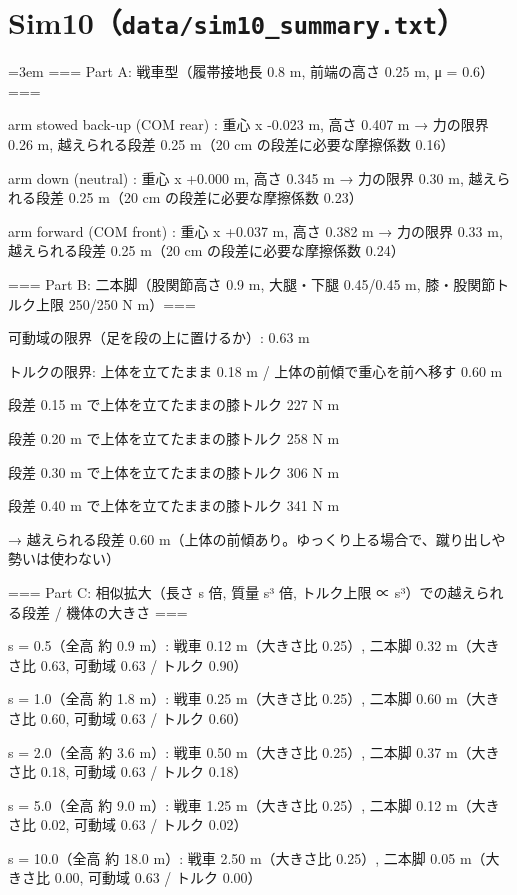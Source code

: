 \section{Sim10（\texttt{data/sim10\_summary.txt}）}
{\footnotesize\raggedright\sloppy\setlength{\parindent}{0pt}\setlength{\parskip}{0pt}\emergencystretch=3em
=== Part A: 戦車型（履帯接地長 0.8 m, 前端の高さ 0.25 m, μ = 0.6）===\par
  arm stowed back-up (COM rear) : 重心 x -0.023 m, 高さ 0.407 m → 力の限界 0.26 m, 越えられる段差 0.25 m（20 cm の段差に必要な摩擦係数 0.16）\par
  arm down (neutral)            : 重心 x +0.000 m, 高さ 0.345 m → 力の限界 0.30 m, 越えられる段差 0.25 m（20 cm の段差に必要な摩擦係数 0.23）\par
  arm forward (COM front)       : 重心 x +0.037 m, 高さ 0.382 m → 力の限界 0.33 m, 越えられる段差 0.25 m（20 cm の段差に必要な摩擦係数 0.24）\par
\mbox{}\par
=== Part B: 二本脚（股関節高さ 0.9 m, 大腿・下腿 0.45/0.45 m, 膝・股関節トルク上限 250/250 N m）===\par
  可動域の限界（足を段の上に置けるか）: 0.63 m\par
  トルクの限界: 上体を立てたまま 0.18 m / 上体の前傾で重心を前へ移す 0.60 m\par
    段差 0.15 m で上体を立てたままの膝トルク    227 N m\par
    段差 0.20 m で上体を立てたままの膝トルク    258 N m\par
    段差 0.30 m で上体を立てたままの膝トルク    306 N m\par
    段差 0.40 m で上体を立てたままの膝トルク    341 N m\par
  → 越えられる段差 0.60 m（上体の前傾あり。ゆっくり上る場合で、蹴り出しや勢いは使わない）\par
\mbox{}\par
=== Part C: 相似拡大（長さ s 倍, 質量 s³ 倍, トルク上限 ∝ s³）での越えられる段差 / 機体の大きさ ===\par
  s =  0.5（全高 約  0.9 m）: 戦車   0.12 m（大きさ比 0.25）, 二本脚   0.32 m（大きさ比 0.63, 可動域 0.63 / トルク 0.90）\par
  s =  1.0（全高 約  1.8 m）: 戦車   0.25 m（大きさ比 0.25）, 二本脚   0.60 m（大きさ比 0.60, 可動域 0.63 / トルク 0.60）\par
  s =  2.0（全高 約  3.6 m）: 戦車   0.50 m（大きさ比 0.25）, 二本脚   0.37 m（大きさ比 0.18, 可動域 0.63 / トルク 0.18）\par
  s =  5.0（全高 約  9.0 m）: 戦車   1.25 m（大きさ比 0.25）, 二本脚   0.12 m（大きさ比 0.02, 可動域 0.63 / トルク 0.02）\par
  s = 10.0（全高 約 18.0 m）: 戦車   2.50 m（大きさ比 0.25）, 二本脚   0.05 m（大きさ比 0.00, 可動域 0.63 / トルク 0.00）\par
}

